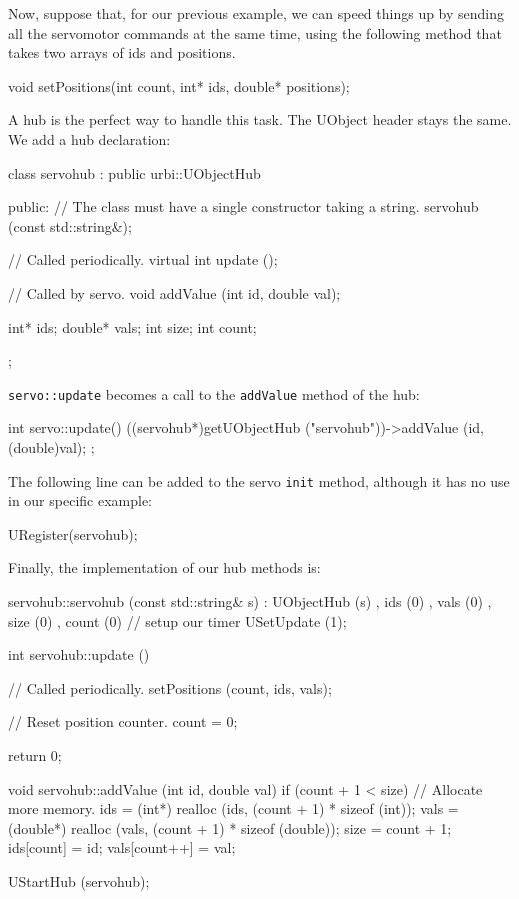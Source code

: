 Now, suppose that, for our previous example, we can speed things up by
sending all the servomotor commands at the same time, using the
following method that takes two arrays of ids and positions.

\begin{cxx}
void setPositions(int count, int* ids, double* positions);
\end{cxx}

A hub is the perfect way to handle this task. The UObject header stays
the same. We add a hub declaration:

\begin{cxx}
class servohub : public urbi::UObjectHub
{
public:
  // The class must have a single constructor taking a string.
  servohub (const std::string&);

  // Called periodically.
  virtual int update ();

  // Called by servo.
  void addValue (int id, double val);

  int* ids;
  double* vals;
  int size;
  int count;
};
\end{cxx}

\lstinline{servo::update} becomes a call to the \lstinline{addValue}
method of the hub:

\begin{cxx}
int
servo::update()
{
  ((servohub*)getUObjectHub ("servohub"))->addValue (id, (double)val);
};
\end{cxx}

The following line can be added to the servo \lstinline{init} method,
although it has no use in our specific example:

\begin{cxx}
URegister(servohub);
\end{cxx}

Finally, the implementation of our hub methods is:

\begin{cxx}
servohub::servohub (const std::string& s)
  : UObjectHub (s)
  , ids   (0)
  , vals  (0)
  , size  (0)
  , count (0)
{
  // setup our timer
  USetUpdate (1);
}

int
servohub::update ()
{
  // Called periodically.
  setPositions (count, ids, vals);

  // Reset position counter.
  count = 0;

  return 0;
}

void
servohub::addValue (int id, double val)
{
  if (count + 1 < size)
  {
    // Allocate more memory.
    ids = (int*) realloc (ids, (count + 1) * sizeof (int));
    vals = (double*) realloc (vals, (count + 1) * sizeof (double));
    size = count + 1;
  }
  ids[count] = id;
  vals[count++] = val;
}

UStartHub (servohub);
\end{cxx}

